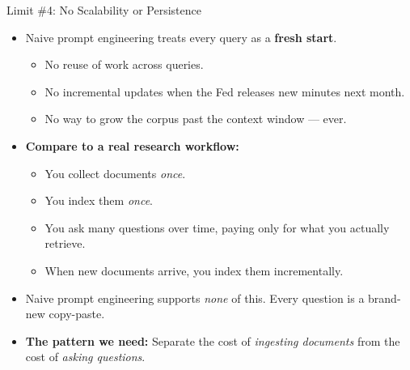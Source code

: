 \begin{frame}{Limit \#4: No Scalability or Persistence}
\begin{itemize}
\item Naive prompt engineering treats every query as a \textbf{fresh start}.
\begin{itemize}
    \item No reuse of work across queries.
    \item No incremental updates when the Fed releases new minutes next month.
    \item No way to grow the corpus past the context window --- ever.
\end{itemize}

\medskip
\item \textbf{Compare to a real research workflow:}
\begin{itemize}
    \item You collect documents \emph{once}.
    \item You index them \emph{once}.
    \item You ask many questions over time, paying only for what you actually retrieve.
    \item When new documents arrive, you index them incrementally.
\end{itemize}

\medskip
\item Naive prompt engineering supports \emph{none} of this. Every question is a brand-new copy-paste.

\medskip
\item \textbf{The pattern we need:} Separate the cost of \emph{ingesting documents} from the cost of \emph{asking questions}.
\end{itemize}
\end{frame}

